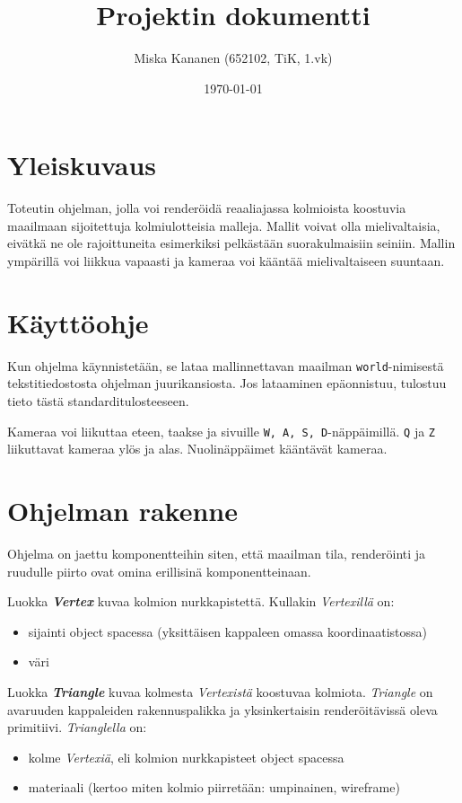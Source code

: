 \documentclass[12pt] {article}
\begin{document}
\title {Projektin dokumentti}
\author {Miska Kananen (652102, TiK, 1.vk)}
\date {\today}
\maketitle

\tableofcontents

\section {Yleiskuvaus}

Toteutin ohjelman, jolla voi renderöidä reaaliajassa kolmioista koostuvia maailmaan sijoitettuja kolmiulotteisia malleja. Mallit voivat olla mielivaltaisia, eivätkä ne ole rajoittuneita esimerkiksi pelkästään suorakulmaisiin seiniin. Mallin ympärillä voi liikkua vapaasti ja kameraa voi kääntää mielivaltaiseen suuntaan.

\section {Käyttöohje}

Kun ohjelma käynnistetään, se lataa mallinnettavan maailman \texttt{world}-nimisestä tekstitiedostosta ohjelman juurikansiosta. Jos lataaminen epäonnistuu, tulostuu tieto tästä standarditulosteeseen.

Kameraa voi liikuttaa eteen, taakse ja sivuille \texttt{W, A, S, D}-näppäimillä. \texttt{Q} ja \texttt{Z} liikuttavat kameraa ylös ja alas. Nuolinäppäimet kääntävät kameraa.

\section {Ohjelman rakenne}

Ohjelma on jaettu komponentteihin siten, että maailman tila, renderöinti ja ruudulle piirto ovat omina erillisinä komponentteinaan.

Luokka \textit{\textbf{Vertex}} kuvaa kolmion nurkkapistettä. Kullakin \textit{Vertexillä} on:
\begin{itemize}
	\item sijainti object spacessa (yksittäisen kappaleen omassa koordinaatistossa)
	\item väri
\end{itemize}

Luokka \textit{\textbf{Triangle}} kuvaa kolmesta \textit{Vertexistä} koostuvaa kolmiota. \textit{Triangle} on avaruuden kappaleiden rakennuspalikka ja yksinkertaisin renderöitävissä oleva primitiivi. \textit{Trianglella} on:
\begin{itemize}
	\item kolme \textit{Vertexiä}, eli kolmion nurkkapisteet object spacessa
	\item materiaali (kertoo miten kolmio piirretään: umpinainen, wireframe)
\end{itemize}
\end{document}
